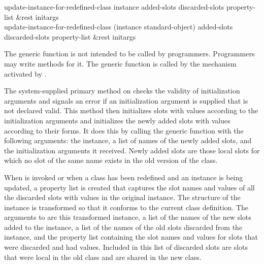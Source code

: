 \begin{defun}
update-instance-for-redefined-class instance added-slots
    discarded-slots property-list &rest initargs \\
update-instance-for-redefined-class (instance standard-object) added-slots
    discarded-slots property-list &rest initargs

\relax
{}
\noindent
The generic function  is not
intended to be called by programmers. Programmers may
write methods for it.  The generic function 
 is called by the mechanism
activated by .

The system-supplied primary method on 
 checks the validity of
initialization arguments and signals an error if an initialization
argument is supplied that is not declared valid.  This method then
initializes slots with values according to the initialization
arguments and initializes the newly added slots with values according
to their  forms.  It does this by calling the generic
function  with the following arguments: the instance,
a list of names of the newly added slots, and the initialization
arguments it received.  Newly added slots are those local slots for which
no slot of the same name exists in the old version of the class.





When  is invoked or when a class has been
redefined and an instance is being updated, a property list is created
that captures the slot names and values of all the discarded slots with
values in the original instance.  The structure of the instance is
transformed so that it conforms to the current class definition.  The
arguments to  are this
transformed instance, a list of the names of the new slots added to the
instance, a list of the names of the old slots discarded from the
instance, and the property list containing the slot names and values for
slots that were discarded and had values.  Included in this list of
discarded slots are slots that were local in the old class and are
shared in the new class.


\end{defun}
